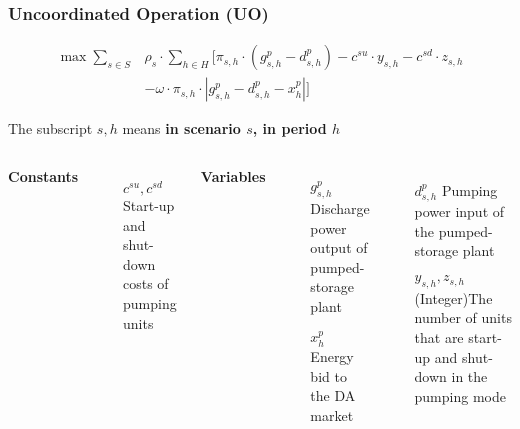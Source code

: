 \begin{frame}
  \frametitle{Uncoordinated Operation (UO)}
\begin{tcolorbox}[colback=white!5,colframe=white!40!black,title= Model of Pumped-Storage Plant]
  \begin{equation}
    \begin{split}
    \max
      \sum_{s\in S} & \rho_s  \cdot  \sum_{h\in H}[\pi_{s,h}\cdot (g_{s,h}^p-d_{s,h}^p) -c^{su}\cdot y_{s,h} -c^{sd}\cdot z_{s,h} \\
     & -  \omega\cdot\pi_{s,h}\cdot|g_{s,h}^p -d_{s,h}^p- x_{h}^p|]
   \end{split}
  \end{equation}
\end{tcolorbox}
The subscript $s,h$ means \textbf{in scenario $s$, in period $h$}
\begin{columns}
\textbf{Constants}
\begin{itemize}
\item[$c^{su},c^{sd}$] Start-up and shut-down costs of pumping units
\end{itemize}
\textbf{Variables}
\begin{itemize}
\item[$g_{s,h}^p$] Discharge power output of pumped-storage plant
\item[$x_{h}^p$] Energy bid to the DA market
\end{itemize}
\begin{itemize}
\item[$d_{s,h}^p$] Pumping power input of the pumped-storage plant
\item[$y_{s,h},z_{s,h}$] (Integer)The number of units that are start-up and shut-down in the pumping mode
\end{itemize}
\end{columns}
\end{frame}

